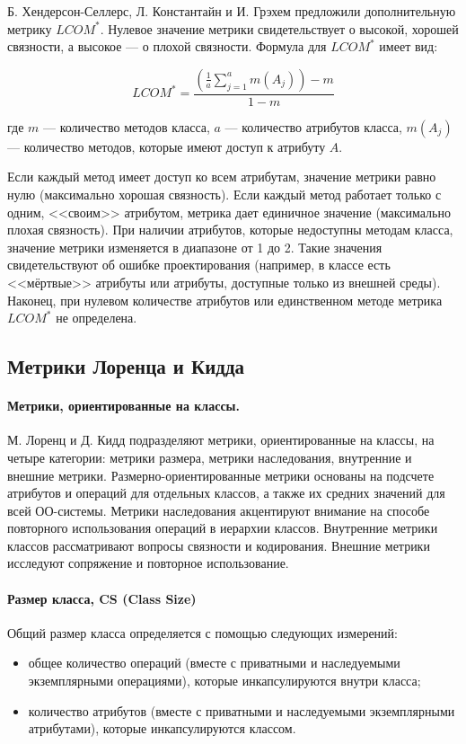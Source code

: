 \documentclass{../../text-style}
\begin{document}
Б. Хендерсон-Селлерс, Л. Константайн и И. Грэхем предложили дополнитель­ную метрику $LCOM^*$. Нулевое значение метрики свидетельствует о высокой, хорошей связности, а высокое --- о плохой связности. Формула для $LCOM^*$ имеет вид:

$$LCOM^* = \frac{(\frac{1}{a}\sum_{j=1}^{a}m(A_j)) - m}{1 - m}$$

где $m$ --- количество методов класса, $a$ --- количество атрибутов класса, $m(A_j)$ --- количество методов, которые имеют доступ к атрибуту $A$.

Если каждый метод имеет доступ ко всем атрибутам, значение метрики равно нулю (максимально хорошая связность). Если каждый метод работает только с од­ним, <<своим>> атрибутом, метрика дает единичное значение (максимально плохая связность). При наличии атрибутов, которые недоступны методам класса, значение метрики изменяется в диапазоне от 1 до 2. Такие значения свидетельствуют об ошибке проектирования (например, в классе есть <<мёртвые>> атрибуты или атрибуты, доступные только из внешней среды). Наконец, при нулевом количестве атрибутов или единственном методе метрика $LCOM^*$ не определена.

\subsection{Метрики Лоренца и Кидда}

\paragraph{Метрики, ориентированные на классы.} М. Лоренц и Д. Кидд подразделяют метрики, ориентированные на классы, на четыре категории: метрики размера, метрики наследования, внутренние и внешние метрики. Размерно-ориентированные метрики основаны на подсчете атрибутов и опера­ций для отдельных классов, а также их средних значений для всей ОО-системы. Метрики наследования акцентируют внимание на способе повторного использования операций в иерархии классов. Внутренние метрики классов рассматривают вопросы связности и кодирования. Внешние метрики исследуют сопряжение и повторное использование.

\paragraph{Размер класса, CS (Class Size)} Общий размер класса определяется с помощью следующих измерений:

\begin{itemize}
    \item общее количество операций (вместе с приватными и наследуемыми экземплярными операциями), которые инкапсулируются внутри класса;
    \item количество атрибутов (вместе с приватными и наследуемыми экземплярными атрибутами), которые инкапсулируются классом.
\end{itemize}
\end{document}
